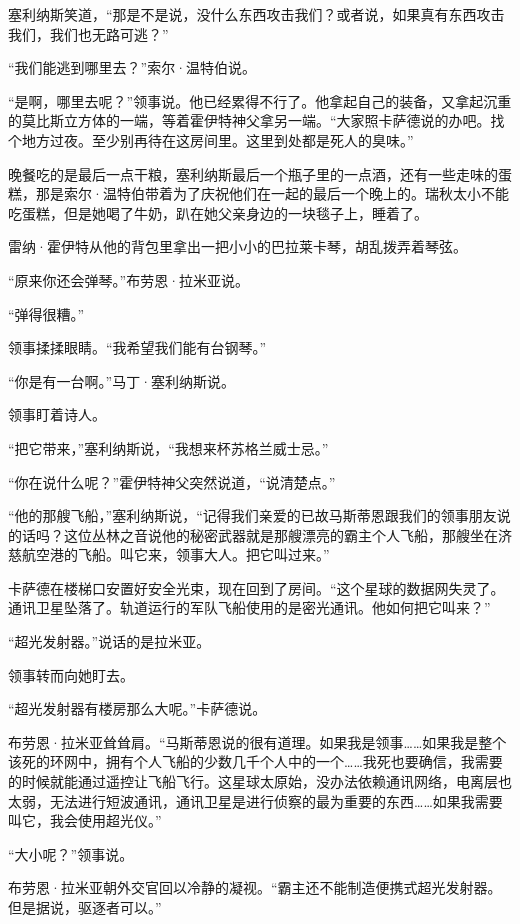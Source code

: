 \documentclass[AutoFakeBold=true]{book}
\begin{document}
塞利纳斯笑道，``那是不是说，没什么东西攻击我们？或者说，如果真有东西攻击我们，我们也无路可逃？''

``我们能逃到哪里去？''索尔·温特伯说。

``是啊，哪里去呢？''领事说。他已经累得不行了。他拿起自己的装备，又拿起沉重的莫比斯立方体的一端，等着霍伊特神父拿另一端。``大家照卡萨德说的办吧。找个地方过夜。至少别再待在这房间里。这里到处都是死人的臭味。''

\vspace*{1em}

晚餐吃的是最后一点干粮，塞利纳斯最后一个瓶子里的一点酒，还有一些走味的蛋糕，那是索尔·温特伯带着为了庆祝他们在一起的最后一个晚上的。瑞秋太小不能吃蛋糕，但是她喝了牛奶，趴在她父亲身边的一块毯子上，睡着了。

雷纳·霍伊特从他的背包里拿出一把小小的巴拉莱卡琴，胡乱拨弄着琴弦。

``原来你还会弹琴。''布劳恩·拉米亚说。

``弹得很糟。''

领事揉揉眼睛。``我希望我们能有台钢琴。''

``你是有一台啊。''马丁·塞利纳斯说。

领事盯着诗人。

``把它带来，''塞利纳斯说，``我想来杯苏格兰威士忌。''

``你在说什么呢？''霍伊特神父突然说道，``说清楚点。''

``他的{\kaishu 那艘飞船}，''塞利纳斯说，``记得我们亲爱的已故马斯蒂恩跟我们的领事朋友说的话吗？这位丛林之音说他的秘密武器就是那艘漂亮的霸主个人飞船，那艘坐在济慈航空港的飞船。叫它来，领事大人。把它叫过来。''

卡萨德在楼梯口安置好安全光束，现在回到了房间。``这个星球的数据网失灵了。通讯卫星坠落了。轨道运行的军队飞船使用的是密光通讯。他如何把它叫来？''

``超光发射器。''说话的是拉米亚。

领事转而向她盯去。

``超光发射器有楼房那么大呢。''卡萨德说。

布劳恩·拉米亚耸耸肩。``马斯蒂恩说的很有道理。如果我是领事……如果我是整个该死的环网中，拥有个人飞船的少数几千个人中的一个……我死也要确信，我需要的时候就能通过遥控让飞船飞行。这星球太原始，没办法依赖通讯网络，电离层也太弱，无法进行短波通讯，通讯卫星是进行侦察的最为重要的东西……如果我需要叫它，我会使用超光仪。''

``大小呢？''领事说。

布劳恩·拉米亚朝外交官回以冷静的凝视。``霸主还不能制造便携式超光发射器。但是据说，驱逐者可以。''
\end{document}
